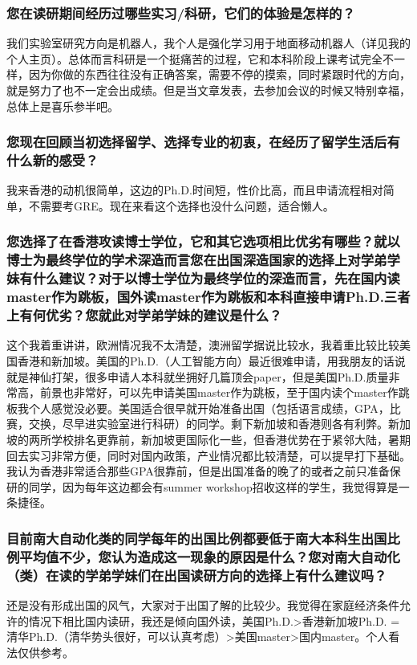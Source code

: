\documentclass[a4paper,UTF8]{book}
\begin{document}
    \subsubsection*{您在读研期间经历过哪些实习/科研，它们的体验是怎样的？}
    我们实验室研究方向是机器人，我个人是强化学习用于地面移动机器人（详见我的个人主页）。总体而言科研是一个挺痛苦的过程，它和本科阶段上课考试完全不一样，因为你做的东西往往没有正确答案，需要不停的摸索，同时紧跟时代的方向，就是努力了也不一定会出成绩。但是当文章发表，去参加会议的时候又特别幸福，总体上是喜乐参半吧。
    \subsubsection*{您现在回顾当初选择留学、选择专业的初衷，在经历了留学生活后有什么新的感受？}
    我来香港的动机很简单，这边的Ph.D.时间短，性价比高，而且申请流程相对简单，不需要考GRE。现在来看这个选择也没什么问题，适合懒人。
    \subsubsection*{您选择了在香港攻读博士学位，它和其它选项相比优劣有哪些？就以博士为最终学位的学术深造而言您在出国深造国家的选择上对学弟学妹有什么建议？对于以博士学位为最终学位的深造而言，先在国内读master作为跳板，国外读master作为跳板和本科直接申请Ph.D.三者上有何优劣？您就此对学弟学妹的建议是什么？}
    这个我着重讲讲，欧洲情况我不太清楚，澳洲留学据说比较水，我着重比较比较美国香港和新加坡。美国的Ph.D.（人工智能方向）最近很难申请，用我朋友的话说就是神仙打架，很多申请人本科就坐拥好几篇顶会paper，但是美国Ph.D.质量非常高，前景也非常好，可以先申请美国master作为跳板，至于国内读个master作跳板我个人感觉没必要。美国适合很早就开始准备出国（包括语言成绩，GPA，比赛，交换，尽早进实验室进行科研）的同学。剩下新加坡和香港则各有利弊。新加坡的两所学校排名更靠前，新加坡更国际化一些，但香港优势在于紧邻大陆，暑期回去实习非常方便，同时对国内政策，产业情况都比较清楚，可以提早打下基础。
    我认为香港非常适合那些GPA很靠前，但是出国准备的晚了的或者之前只准备保研的同学，因为每年这边都会有summer workshop招收这样的学生，我觉得算是一条捷径。

    \subsubsection*{目前南大自动化类的同学每年的出国比例都要低于南大本科生出国比例平均值不少，您认为造成这一现象的原因是什么？您对南大自动化（类）在读的学弟学妹们在出国读研方向的选择上有什么建议吗？}
    还是没有形成出国的风气，大家对于出国了解的比较少。我觉得在家庭经济条件允许的情况下相比国内读研，我还是倾向国外读，美国Ph.D.>香港新加坡Ph.D. = 清华Ph.D.（清华势头很好，可以认真考虑）>美国master>国内master。个人看法仅供参考。
    
\end{document}
